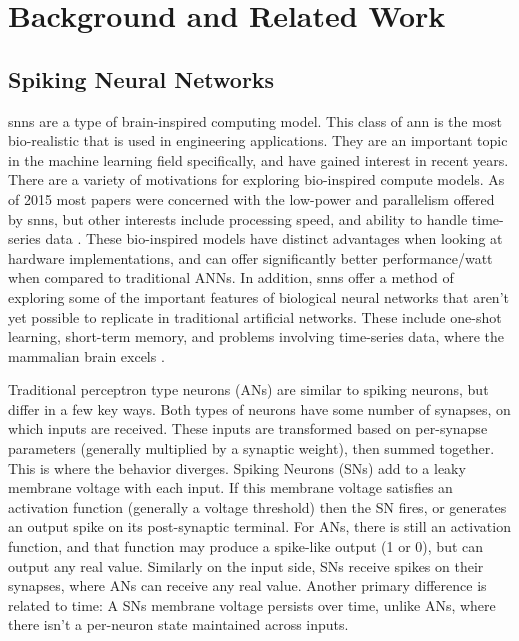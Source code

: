 %
%


\chapter{Background and Related Work}\label{chapter:background}
    \section{Spiking Neural Networks}
    \Glspl{snn} are a type of brain-inspired computing
    model. This class of \Gls{ann} is the most
    bio-realistic that is used in engineering applications. They are an
    important topic in the machine learning field specifically, and have gained
    interest in recent years. There are a variety of motivations for exploring
    bio-inspired compute models. As of 2015 most papers were concerned with the
    low-power and parallelism offered by \Glspl{snn}, but other interests include
    processing speed, and ability to handle time-series data
    \cite{schuman_2017}. These bio-inspired models have distinct advantages when
    looking at hardware implementations, and can offer significantly better
    performance/watt when compared to traditional ANNs. In addition, \Glspl{snn} offer
    a method of exploring some of the important features of biological neural
    networks that aren't yet possible to replicate in traditional artificial
    networks. These include one-shot learning, short-term memory, and problems
    involving time-series data, where the mammalian brain excels
    \cite{kasabov_2013}.


    Traditional perceptron type neurons (ANs) are similar to spiking neurons,
    but differ in a few key ways. Both types of neurons have some number of
    synapses, on which inputs are received. These inputs are transformed based
    on per-synapse parameters (generally multiplied by a synaptic weight), then
    summed together. This is where the behavior diverges. Spiking Neurons (SNs)
    add to a leaky membrane voltage with each input. If this membrane voltage
    satisfies an activation function (generally a voltage threshold) then the SN
    fires, or generates an output spike on its post-synaptic terminal. For ANs,
    there is still an activation function, and that function may produce a
    spike-like output (1 or 0), but can output any real value. Similarly on the
    input side, SNs receive spikes on their synapses, where ANs can receive any
    real value. Another primary difference is related to time: A SNs membrane
    voltage persists over time, unlike ANs, where there isn't a per-neuron state
    maintained across inputs.
    
